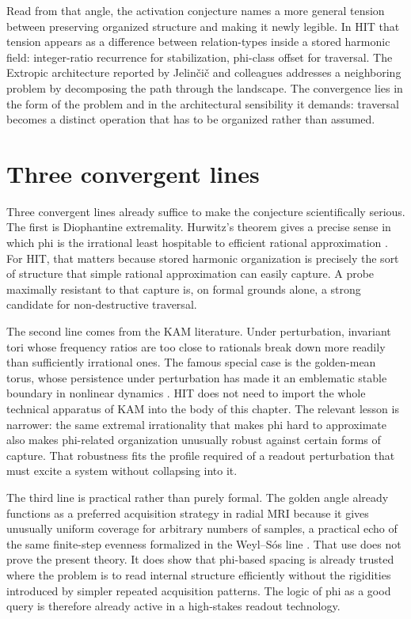 Read from that angle, the activation conjecture names a more general tension between preserving organized structure and making it newly legible. In HIT that tension appears as a difference between relation-types inside a stored harmonic field: integer-ratio recurrence for stabilization, phi-class offset for traversal. The Extropic architecture reported by Jelin{\v{c}}i{\v{c}} and colleagues addresses a neighboring problem by decomposing the path through the landscape. The convergence lies in the form of the problem and in the architectural sensibility it demands: traversal becomes a distinct operation that has to be organized rather than assumed.

\section{Three convergent lines}

Three convergent lines already suffice to make the conjecture scientifically serious. The first is Diophantine extremality. Hurwitz's theorem gives a precise sense in which phi is the irrational least hospitable to efficient rational approximation \parencite{hurwitz_1891}. For HIT, that matters because stored harmonic organization is precisely the sort of structure that simple rational approximation can easily capture. A probe maximally resistant to that capture is, on formal grounds alone, a strong candidate for non-destructive traversal.

The second line comes from the KAM literature. Under perturbation, invariant tori whose frequency ratios are too close to rationals break down more readily than sufficiently irrational ones. The famous special case is the golden-mean torus, whose persistence under perturbation has made it an emblematic stable boundary in nonlinear dynamics \parencite{greene_1979}. HIT does not need to import the whole technical apparatus of KAM into the body of this chapter. The relevant lesson is narrower: the same extremal irrationality that makes phi hard to approximate also makes phi-related organization unusually robust against certain forms of capture. That robustness fits the profile required of a readout perturbation that must excite a system without collapsing into it.

The third line is practical rather than purely formal. The golden angle already functions as a preferred acquisition strategy in radial MRI because it gives unusually uniform coverage for arbitrary numbers of samples, a practical echo of the same finite-step evenness formalized in the Weyl--S\'os line \parencite{winkelmann_2007,sos_1958}. That use does not prove the present theory. It does show that phi-based spacing is already trusted where the problem is to read internal structure efficiently without the rigidities introduced by simpler repeated acquisition patterns. The logic of phi as a good query is therefore already active in a high-stakes readout technology.

